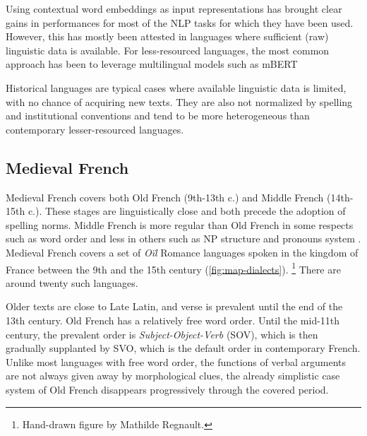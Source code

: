 Using contextual word embeddings as input representations has brought clear gains in performances for most of the NLP tasks for which they have been used. However, this has mostly been attested in languages where sufficient (raw) linguistic data is available. For less-resourced languages, the most common approach has been to leverage multilingual models such as mBERT \citep{devlin-etal-2019-bert}

Historical languages are typical cases where available linguistic data is limited, with no chance of acquiring new texts. They are also not normalized by spelling and institutional conventions and tend to be more heterogeneous than contemporary lesser-resourced languages.

\subsection{Medieval French}

Medieval French covers both Old French (9th-13th c.) and Middle French (14th-15th c.). These stages are linguistically close and both precede the adoption of spelling norms. Middle French is more regular than Old French in some respects such as word order \citep{marchello-Nizia-etal-2020-grande} and less in others such as NP structure and pronouns system \citep{marchello-nizia-etal-1979-histoire}. Medieval French covers a set of \textit{Oïl} Romance languages spoken in the kingdom of France between the 9th and the 15th century (\cref{fig:map-dialects}). \footnote{Hand-drawn figure by Mathilde Regnault.} There are around twenty such languages.

Older texts are close to Late Latin, and verse is prevalent until the end of the 13th century. Old French has a relatively free word order. Until the mid-11th century, the prevalent order is \textit{Subject-Object-Verb} (SOV), which is then gradually supplanted by SVO, which is the default order in contemporary French. Unlike most languages with free word order, the functions of verbal arguments are not always given away by morphological clues, the already simplistic case system of Old French disappears progressively through the covered period.

